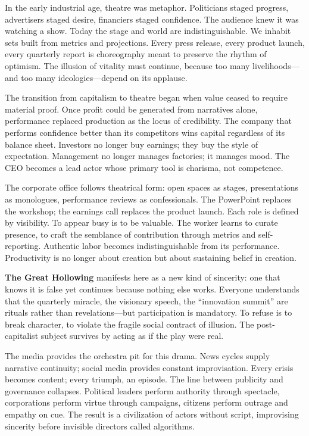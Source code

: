 \documentclass[11pt,twoside]{book}
\begin{document}
In the early industrial age, theatre was metaphor.  Politicians staged progress, advertisers staged desire, financiers staged confidence.  The audience knew it was watching a show.  Today the stage and world are indistinguishable.  We inhabit sets built from metrics and projections.  Every press release, every product launch, every quarterly report is choreography meant to preserve the rhythm of optimism.  The illusion of vitality must continue, because too many livelihoods—and too many ideologies—depend on its applause.

The transition from capitalism to theatre began when value ceased to require material proof.  Once profit could be generated from narratives alone, performance replaced production as the locus of credibility.  The company that performs confidence better than its competitors wins capital regardless of its balance sheet.  Investors no longer buy earnings; they buy the style of expectation.  Management no longer manages factories; it manages mood.  The CEO becomes a lead actor whose primary tool is charisma, not competence.

The corporate office follows theatrical form: open spaces as stages, presentations as monologues, performance reviews as confessionals.  The PowerPoint replaces the workshop; the earnings call replaces the product launch.  Each role is defined by visibility.  To appear busy is to be valuable.  The worker learns to curate presence, to craft the semblance of contribution through metrics and self-reporting.  Authentic labor becomes indistinguishable from its performance.  Productivity is no longer about creation but about sustaining belief in creation.

\textbf{The Great Hollowing} manifests here as a new kind of sincerity: one that knows it is false yet continues because nothing else works.  Everyone understands that the quarterly miracle, the visionary speech, the “innovation summit” are rituals rather than revelations—but participation is mandatory.  To refuse is to break character, to violate the fragile social contract of illusion.  The post-capitalist subject survives by acting as if the play were real.

The media provides the orchestra pit for this drama.  News cycles supply narrative continuity; social media provides constant improvisation.  Every crisis becomes content; every triumph, an episode.  The line between publicity and governance collapses.  Political leaders perform authority through spectacle, corporations perform virtue through campaigns, citizens perform outrage and empathy on cue.  The result is a civilization of actors without script, improvising sincerity before invisible directors called algorithms.
\end{document}
